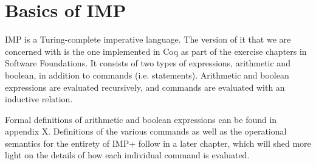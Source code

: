 \section{Basics of IMP}
IMP is a Turing-complete imperative language. The version of it that we are concerned with is the one implemented in Coq as part of the exercise chapters in Software Foundations. It consists of two types of expressions, arithmetic and boolean, in addition to commands (i.e. statements). Arithmetic and boolean expressions are evaluated recursively, and commands are evaluated with an inductive relation.

Formal definitions of arithmetic and boolean expressions can be found in appendix X. Definitions of the various commands as well as the operational semantics for the entirety of IMP+ follow in a later chapter, which will shed more light on the details of how each individual command is evaluated.